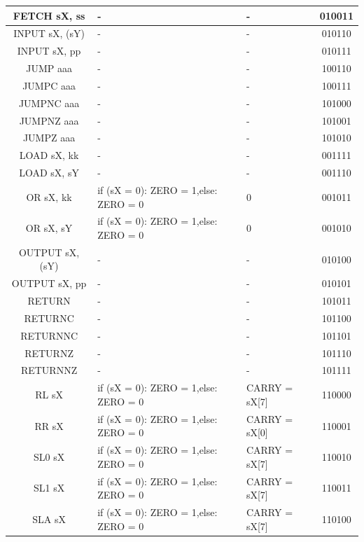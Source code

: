 \documentclass{scrartcl}
\begin{document}
\begin{longtable}{||c|p{6cm}|p{6cm}|c||}
    FETCH sX, ss & - & - & 010011 \\ \hline
    INPUT sX, (sY) & - & - & 010110 \\ \hline
    INPUT sX, pp & - & - & 010111 \\ \hline
    JUMP aaa & - & - & 100110 \\ \hline
    JUMPC aaa & - & - & 100111 \\ \hline
    JUMPNC aaa & - & - & 101000 \\ \hline
    JUMPNZ aaa & - & - & 101001 \\ \hline
    JUMPZ aaa & - & - & 101010 \\ \hline 
    LOAD sX, kk & - & - & 001111 \\ \hline
    LOAD sX, sY & - & - & 001110 \\ \hline 
    OR sX, kk & if (sX = 0): ZERO = 1,\newline else: ZERO = 0 & 0 & 001011 \\ \hline
    OR sX, sY & if (sX = 0): ZERO = 1,\newline else: ZERO = 0 & 0 & 001010 \\ \hline
    OUTPUT sX, (sY) & - & - & 010100 \\ \hline
    OUTPUT sX, pp & - & - & 010101 \\ \hline
    RETURN & - & - & 101011 \\ \hline
    RETURNC & - & - & 101100 \\ \hline
    RETURNNC & - & - & 101101 \\ \hline
    RETURNZ & - & - & 101110 \\ \hline
    RETURNNZ & - & - & 101111 \\ \hline
    RL sX & if (sX = 0): ZERO = 1,\newline else: ZERO = 0
    & CARRY = sX[7] & 110000 \\ \hline
    RR sX & if (sX = 0): ZERO = 1,\newline else: ZERO = 0
    & CARRY = sX[0] & 110001 \\ \hline
    SL0 sX & if (sX = 0): ZERO = 1,\newline else: ZERO = 0
    & CARRY = sX[7] & 110010 \\ \hline
    SL1 sX & if (sX = 0): ZERO = 1,\newline else: ZERO = 0
    & CARRY = sX[7] & 110011 \\ \hline
    SLA sX & if (sX = 0): ZERO = 1,\newline else: ZERO = 0
    & CARRY = sX[7] & 110100 \\ \hline

\end{longtable}
\end{document}
